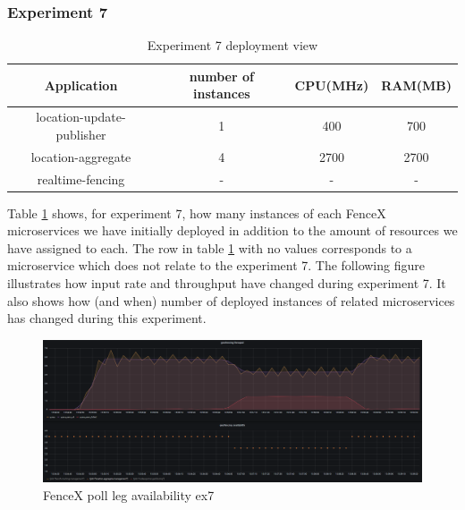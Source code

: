 \documentclass[a4]{report}
\begin{document}
    \clearpage

    \subsubsection{Experiment 7}
    \begin{table}[h!]
        \centering
        \begin{tabular}{|c|c|c|c|}
            \hline
            Application               & number of instances & CPU(MHz) & RAM(MB) \\
            \hline
            location-update-publisher & 1                   & 400      & 700     \\
            location-aggregate        & 4                   & 2700     & 2700    \\
            realtime-fencing          & -                   & -        & -       \\
            \hline
        \end{tabular}
        \caption{Experiment 7 deployment view}
        \label{table:ex7-dv}
    \end{table}

    Table \ref{table:ex7-dv} shows, for experiment 7, how many instances of each FenceX microservices we have initially
    deployed in addition to the amount of resources we have assigned to each.
    The row in table \ref{table:ex7-dv} with no values corresponds to a microservice which does not relate to the
    experiment 7.
    The following figure illustrates how input rate and throughput have changed during experiment 7.
    It also shows how (and when) number of deployed instances of related microservices has changed during this
    experiment.

    \begin{figure}[h!]
        \centering
        \caption{FenceX poll leg availability ex7}
        \label{fig:ex7}
        \includegraphics[width=\linewidth, scale=2]{images/evaluation/ex7-benchmarking-ongoing-2per10sec.png}
    \end{figure}
\end{document}
